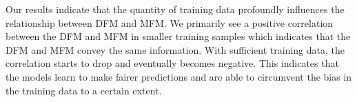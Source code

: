 \documentclass{article}
\begin{document}

Our results indicate that the quantity of training data profoundly
influences the relationship between DFM and MFM. We primarily see a
positive correlation between the DFM and MFM in smaller training
samples which indicates that the DFM and MFM convey the same
information. With sufficient training data, the correlation starts to
drop and eventually becomes negative. This indicates that the models
learn to make fairer predictions and are able to circumvent the bias
in the training data to a certain extent.






\end{document}
